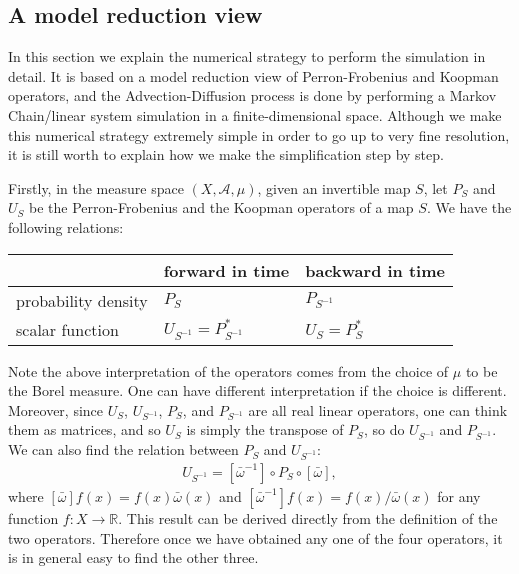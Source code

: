 \subsection{A model reduction view}

In this section we explain the numerical strategy to perform the simulation in detail. It is based on a model reduction view of Perron-Frobenius and Koopman operators, and the Advection-Diffusion process is done by performing a Markov Chain/linear system simulation in a finite-dimensional space. Although we make this numerical strategy extremely simple in order to go up to very fine resolution, it is still worth to explain how we make the simplification step by step.     


Firstly, in the measure space $(X,\mathcal{A},\mu)$, given an invertible map $S$, let $P_S$ and $U_S$ be the Perron-Frobenius and the Koopman
operators of a map $S$. We have the following relations:
\vspace{0.15cm}
\begin{center}
\begin{tabular}{l|ll}
\label{PUtable}
& forward in time
& backward in time
\\
\hline
probability density
& $P_S$
& $P_{S^{-1}}$
\\
scalar function
& $ U_{S^{-1}} = P_{S^{-1}}^* $
& $ U_S  = P_S^*  $
\end{tabular}
\end{center}
\vspace{0.15cm}

  
Note the above interpretation of the operators comes from the choice of $\mu$ to be the Borel measure. One can have different interpretation if the choice is different. Moreover, since $U_S$, $U_{S^{-1}}$, $P_S$, and $P_{S^{-1}}$ are all real linear operators, one can think them as matrices, and so $U_S$ is simply the transpose of $P_S$, so do $U_{S^{-1}}$ and $P_{S^{-1}}$. We can also find the relation between $P_S$ and $U_{S^{-1}}$:  
\begin{eqnarray}
  \label{ABrelation}
        U_{S^{-1}}  = [\bar{\omega}^{-1}] \circ P_S \circ [\bar{\omega}],
\end{eqnarray}
where $[\bar{\omega}]f(x) =f(x) \bar{\omega}(x)$ and $ [\bar{\omega}^{-1}]f(x) =f(x)/ \bar{\omega}(x)$ for any function $f: X \to \mathbb{R}$. This result can be derived directly from the definition of the two operators. Therefore once we have obtained any one of the four operators, it is in general easy to find the other three.

